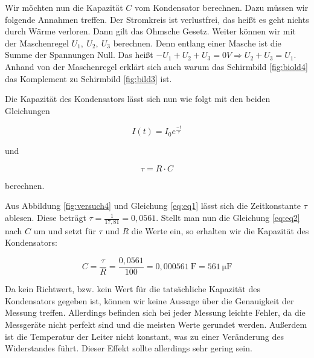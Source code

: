         Wir möchten nun die Kapazität $C$ vom Kondensator berechnen. Dazu müssen wir folgende Annahmen treffen. Der Stromkreis ist verlustfrei, das heißt es geht nichts durch Wärme verloren. Dann gilt das Ohmsche Gesetz. Weiter können wir mit der Maschenregel $U_1,\ U_2,\ U_3$ berechnen. Denn entlang einer Masche ist die Summe der Spannungen Null. Das heißt $-U_1 + U_2 + U_3 = 0V  \Rightarrow U_2 + U_3 = U_1$. Anhand von der Maschenregel erklärt sich auch warum das Schirmbild \ref{fig:biold4} das Komplement zu Schirmbild \ref{fig:bild3} ist.

        Die Kapazität des Kondensators lässt sich nun wie folgt mit den beiden Gleichungen

        \begin{equation}
            I(t) = I_{0} e^{\frac{-t}{\tau}}
            \label{eq:eq1}
        \end{equation}

        und

        \begin{equation}
            \tau = R \cdot C
            \label{eq:eq2}
        \end{equation}

        berechnen.

        Aus Abbildung \ref{fig:versuch4} und Gleichung \ref{eq:eq1} lässt sich die Zeitkonstante $\tau$ ablesen. Diese beträgt $\tau = \frac{1}{17,81} = 0,0561$. Stellt man nun die Gleichung \ref{eq:eq2} nach $C$ um und setzt für $\tau$ und $R$ die Werte ein, so erhalten wir die Kapazität des Kondensators:

        \begin{equation}
            C = \frac{\tau}{R} = \frac{0,0561}{100} = 0,000561\ \mathrm{F} = 561\ \mathrm{\mu F}
        \end{equation}

        Da kein Richtwert, bzw. kein Wert für die tatsächliche Kapazität des Kondensators gegeben ist, können wir keine Aussage über die Genauigkeit der Messung treffen. Allerdings befinden sich bei jeder Messung leichte Fehler, da die Messgeräte nicht perfekt sind und die meisten Werte gerundet werden. Außerdem ist die Temperatur der Leiter nicht konstant, was zu einer Veränderung des Widerstandes führt. Dieser Effekt sollte allerdings sehr gering sein.